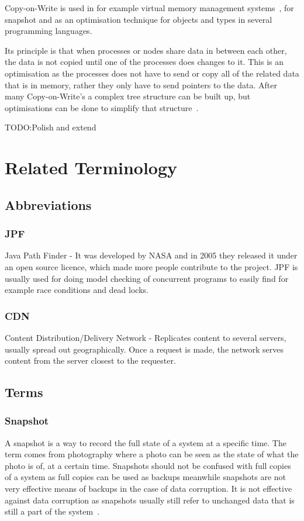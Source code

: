 \documentclass[a4paper,12pt]{article}
\newcommand{\fix}{\colorbox{yellow!30}{TODO:}}
\begin{document}
Copy-on-Write is used in for example virtual memory management systems~\cite{VIRTCOW}, for snapshot
and as an optimisation technique for objects and types in several programming
languages\cite{LANGCOW}.

Its principle is that when processes or nodes share data in between each other, the data is not
copied until one of the processes does changes to it. This is an optimisation as the processes does
not have to send or copy all of the related data that is in memory, rather they only have to send
pointers to the data. After many Copy-on-Write's a complex tree structure can be built up, but
optimisations can be done to simplify that structure~\cite{COPYONWRITE2}.

\fix Polish and extend

\newpage
\section{Related Terminology}
\subsection{Abbreviations}
\subsubsection{JPF}
Java Path Finder - It was developed by NASA and in 2005 they released it under an open source
licence, which made more people contribute to the project. JPF is usually used for doing model
checking of concurrent programs to easily find for example race conditions and dead locks.

\subsubsection{CDN}
Content Distribution/Delivery Network - Replicates content to several servers, usually spread out
geographically. Once a request is made, the network serves content from the server closest to the
requester.

\subsection{Terms}
\subsubsection{Snapshot}
A snapshot is a way to record the full state of a system at a specific time. The term comes from
photography where a photo can be seen as the state of what the photo is of, at a certain time.
Snapshots should not be confused with full copies of a system as full copies can be used as backups
meanwhile snapshots are not very effective means of backups in the case of data corruption. It is
not effective against data corruption as snapshots usually still refer to unchanged data that is
still a part of the system~\cite{SNAPSHOT}.
\end{document}

